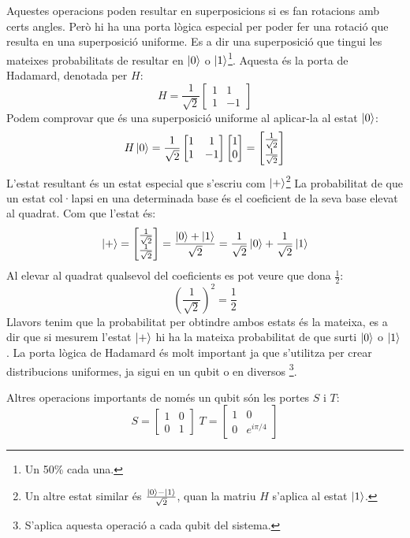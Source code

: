 Aquestes operacions poden resultar en superposicions si es fan rotacions amb certs angles. Però hi ha una porta lògica especial per poder fer una rotació que resulta en una superposició uniforme. Es a dir una superposició que tingui les mateixes probabilitats de resultar en $\ket{0}$ o $\ket{1}$\footnote{Un 50\% cada una.}. Aquesta és la porta de Hadamard, denotada per $H$:
\begin{equation}
	H = \frac{1}{\sqrt{2}}\begin{bmatrix}
		1 & 1 \\ 1 & -1
	\end{bmatrix}
\end{equation}
Podem comprovar que és una superposició uniforme al aplicar-la al estat $\ket{0}$:
$$
H\ket{0} = \frac{1}{\sqrt{2}}\begin{bmatrix}1 & 1 \\ 1 & -1 \end{bmatrix}\begin{bmatrix}1 \\ 0\end{bmatrix} = \begin{bmatrix} \frac{1}{\sqrt{2}} \\ \frac{1}{\sqrt{2}} \end{bmatrix}
$$
L'estat resultant és un estat especial que s'escriu com $\ket{+}$\footnote{Un altre estat similar és $\frac{\ket{0} - \ket{1}}{\sqrt{2}}$, quan la matriu $H$ s'aplica al estat $\ket{1}$.} La probabilitat de que un estat col·lapsi en una determinada base és el coeficient de la seva base elevat al quadrat. Com que l'estat és:
$$
\ket{+} = \begin{bmatrix} \frac{1}{\sqrt{2}} \\ \frac{1}{\sqrt{2}} \end{bmatrix} = \frac{\ket{0} + \ket{1}}{\sqrt{2}} =  \frac{1}{\sqrt{2}}\ket{0} +  \frac{1}{\sqrt{2}}\ket{1}
$$
Al elevar al quadrat qualsevol del coeficients es pot veure que dona $\frac{1}{2}$:
$$
\left(\frac{1}{\sqrt{2}}\right)^2 = \frac{1}{2}
$$
Llavors tenim que la probabilitat per obtindre ambos estats és la mateixa, es a dir que si mesurem l'estat $\ket{+}$ hi ha la mateixa probabilitat de que surti $\ket{0}$ o $\ket{1}$. La porta lògica de Hadamard és molt important ja que s'utilitza per crear distribucions uniformes, ja sigui en un qubit o en diversos \footnote{S'aplica aquesta operació a cada qubit del sistema.}.

Altres operacions importants de només un qubit són les portes $S$ i $T$:
$$
S=\begin{bmatrix} 1 & 0 \\ 0 & 1 \end{bmatrix} \; T=\begin{bmatrix} 1 & 0 \\ 0 & e^{i\pi/4} \end{bmatrix}
$$


